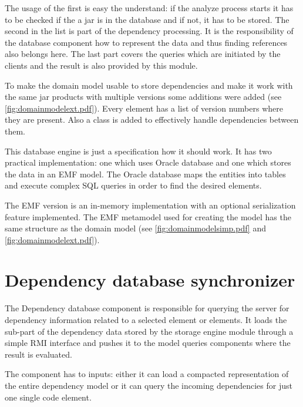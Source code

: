 The usage of the first is easy the understand: if the analyze process starts it
has to be checked if the a jar is in the database and if not, it has to be
stored. The second in the list is part of the dependency processing. It is the
responsibility of the database component how to represent the data and thus
finding references also belongs here. The last part covers the queries which are
initiated by the clients and the result is also provided by this module.

To make the domain model usable to store dependencies and make it work with the
same jar products with multiple versions some additions were added (see
\autoref{fig:domainmodelext.pdf}).  Every element has a list of version numbers where they are
present. Also a  class is added to effectively handle
dependencies between them.

This database engine is just a specification how it should work. It has two
practical implementation: one which uses Oracle database and one which stores
the data in an EMF model. The Oracle database maps the entities into tables and
execute complex SQL queries in order to find the desired elements.

The EMF version is an in-memory implementation with an optional serialization
feature implemented. The EMF metamodel used for creating the model has the same
structure as the domain model (see \autoref{fig:domainmodelsimp.pdf} and
\autoref{fig:domainmodelext.pdf}).



\section{Dependency database synchronizer}
\label{sect:depdbsynch}
The Dependency database component is responsible for querying the server for
dependency information related to a selected element or elements. It loads the
sub-part of the dependency data stored by the storage engine module through a
simple RMI interface and pushes it to the model queries components where the
result is evaluated.

The component has to inputs: either it can load a compacted representation of the 
entire dependency model or it can query the incoming dependencies for just one 
single code element. 

